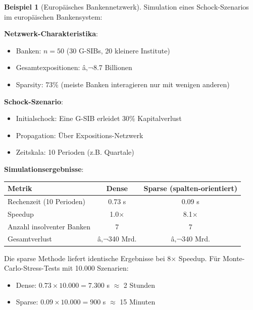 ﻿\documentclass[a4paper,12pt]{report}
\theoremstyle{definition}
\newtheorem{beispiel}{Beispiel}
\begin{document}
	\begin{beispiel}[Europäisches Bankennetzwerk]
		Simulation eines Schock-Szenarios im europäischen Bankensystem:
		
		\textbf{Netzwerk-Charakteristika}:
		\begin{itemize}
			\item Banken: $n = 50$ (30 G-SIBs, 20 kleinere Institute)
			\item Gesamtexpositionen: â‚¬8.7 Billionen
			\item Sparsity: 73\% (meiste Banken interagieren nur mit wenigen anderen)
		\end{itemize}
		
		\textbf{Schock-Szenario}:
		\begin{itemize}
			\item Initialschock: Eine G-SIB erleidet 30\% Kapitalverlust
			\item Propagation: Über Expositions-Netzwerk
			\item Zeitskala: 10 Perioden (z.B. Quartale)
		\end{itemize}
		
		\textbf{Simulationsergebnisse}:
		\begin{center}
			\begin{tabular}{|l|c|c|}
				\hline
				\textbf{Metrik} & \textbf{Dense} & \textbf{Sparse (spalten-orientiert)} \\
				\hline
				Rechenzeit (10 Perioden) & 0.73 s & 0.09 s \\
				Speedup & 1.0$\times$ & 8.1$\times$ \\
				Anzahl insolventer Banken & 7 & 7 \\
				Gesamtverlust & â‚¬340 Mrd. & â‚¬340 Mrd. \\
				\hline
			\end{tabular}
		\end{center}
		
		Die sparse Methode liefert identische Ergebnisse bei 8$\times$ Speedup. Für Monte-Carlo-Stress-Tests mit 10.000 Szenarien:
		\begin{itemize}
			\item Dense: $0.73 \times 10.000 = 7.300$ s $\approx$ 2 Stunden
			\item Sparse: $0.09 \times 10.000 = 900$ s $\approx$ 15 Minuten
		\end{itemize}
	\end{beispiel}
	
\end{document}
